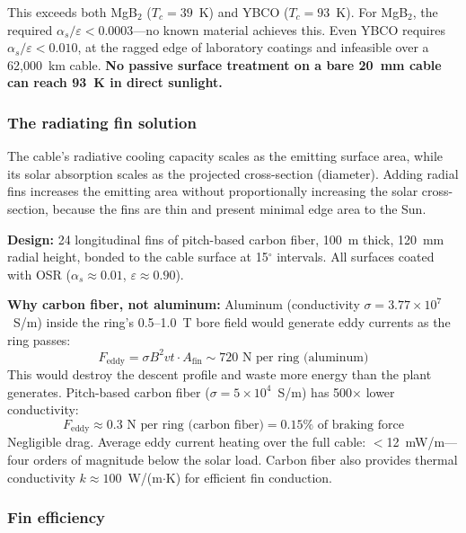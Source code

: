 \documentclass[12pt,letterpaper]{article}
\begin{document}
This exceeds both MgB$_2$ ($T_c = 39$~K) and YBCO ($T_c = 93$~K). For MgB$_2$, the required $\alpha_s/\varepsilon < 0.0003$---no known material achieves this. Even YBCO requires $\alpha_s/\varepsilon < 0.010$, at the ragged edge of laboratory coatings and infeasible over a 62,000~km cable. \textbf{No passive surface treatment on a bare 20~mm cable can reach 93~K in direct sunlight.}

\subsubsection{The radiating fin solution}

The cable's radiative cooling capacity scales as the emitting surface area, while its solar absorption scales as the projected cross-section (diameter). Adding radial fins increases the emitting area without proportionally increasing the solar cross-section, because the fins are thin and present minimal edge area to the Sun.

\textbf{Design:} 24 longitudinal fins of pitch-based carbon fiber, 100~\textmu m thick, 120~mm radial height, bonded to the cable surface at 15$^\circ$ intervals. All surfaces coated with OSR ($\alpha_s \approx 0.01$, $\varepsilon \approx 0.90$).

\textbf{Why carbon fiber, not aluminum:} Aluminum (conductivity $\sigma = 3.77 \times 10^7$~S/m) inside the ring's 0.5--1.0~T bore field would generate eddy currents as the ring passes:
\begin{equation}
F_{\text{eddy}} = \sigma B^2 v t \cdot A_{\text{fin}} \sim 720 \text{~N per ring (aluminum)}
\end{equation}
This would destroy the descent profile and waste more energy than the plant generates. Pitch-based carbon fiber ($\sigma = 5 \times 10^4$~S/m) has 500$\times$ lower conductivity:
\begin{equation}
F_{\text{eddy}} \approx 0.3 \text{~N per ring (carbon fiber)} = 0.15\% \text{ of braking force}
\end{equation}
Negligible drag. Average eddy current heating over the full cable: $<$12~mW/m---four orders of magnitude below the solar load. Carbon fiber also provides thermal conductivity $k \approx 100$~W/(m$\cdot$K) for efficient fin conduction.

\subsubsection{Fin efficiency}
\end{document}
